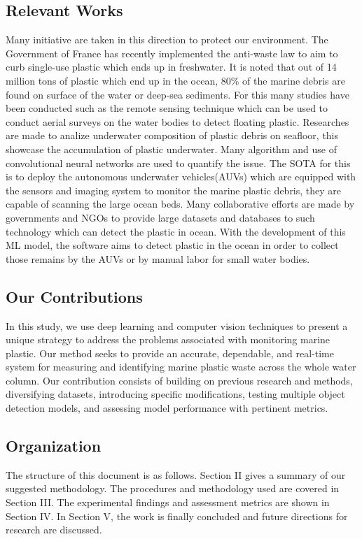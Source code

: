 \documentclass[lettersize,journal]{IEEEtran}
\begin{document}
\subsection{Relevant Works}
Many initiative are taken in this direction to protect our environment. The Government of France has recently implemented the anti-waste law to aim to curb single-use plastic which ends up in freshwater.\cite{France} It is noted that out of 14 million tons of plastic which end up in the ocean, 80\% of the marine debris are found on surface of the water or deep-sea sediments.\cite{IUCN} For this many studies have been conducted such as the remote sensing technique which can be used to conduct aerial surveys on the water bodies to detect floating plastic. \cite{Invest} Researches are made to analize underwater composition of plastic debris on seafloor, this showcase the accumulation of plastic underwater. Many algorithm and use of convolutional neural networks are used to quantify the issue. The SOTA for this is to deploy the autonomous underwater vehicles(AUVs) which are equipped with the sensors and imaging system to monitor the marine plastic debris, they are capable of scanning the large ocean beds. Many collaborative efforts are made by governments and NGOs to provide large datasets and databases to such technology which can detect the plastic in ocean. With the development of this ML model, the software aims to detect plastic in the ocean in order to collect those remains by the AUVs or by manual labor for small water bodies.


\subsection{Our Contributions}
In this study, we use deep learning and computer vision techniques to present a unique strategy to address the problems associated with monitoring marine plastic. Our method seeks to provide an accurate, dependable, and real-time system for measuring and identifying marine plastic waste across the whole water column. Our contribution consists of building on previous research and methods, diversifying datasets, introducing specific modifications, testing multiple object detection models, and assessing model performance with pertinent metrics.


\subsection{Organization}
The structure of this document is as follows. Section II gives a summary of our suggested methodology. The procedures and methodology used are covered in Section III. The experimental findings and assessment metrics are shown in Section IV. In Section V, the work is finally concluded and future directions for research are discussed.
\end{document}
